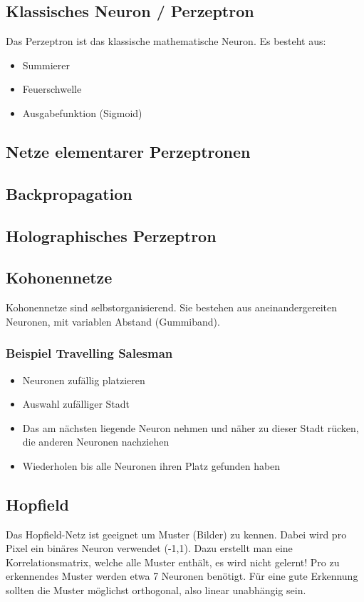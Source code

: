 \subsection{Klassisches Neuron / Perzeptron}
Das Perzeptron ist das klassische mathematische Neuron. Es besteht aus:
\begin{itemize}
	\item Summierer
	\item Feuerschwelle
	\item Ausgabefunktion (Sigmoid)
\end{itemize}
\subsection{Netze elementarer Perzeptronen}
\subsection{Backpropagation}
\subsection{Holographisches Perzeptron}
\subsection{Kohonennetze}
Kohonennetze sind selbstorganisierend. Sie bestehen aus aneinandergereiten Neuronen, mit variablen Abstand (Gummiband).
\subsubsection{Beispiel Travelling Salesman}
\begin{itemize}
	\item Neuronen zufällig platzieren
	\item Auswahl zufälliger Stadt
	\item Das am nächsten liegende Neuron nehmen und näher zu dieser Stadt rücken, die anderen Neuronen nachziehen
	\item Wiederholen bis alle Neuronen ihren Platz gefunden haben
\end{itemize}
\subsection{Hopfield}
Das Hopfield-Netz ist geeignet um Muster (Bilder) zu kennen. Dabei wird pro Pixel ein binäres Neuron verwendet (-1,1).
Dazu erstellt man eine Korrelationsmatrix, welche alle Muster enthält, es wird nicht gelernt!
Pro zu erkennendes Muster werden etwa 7 Neuronen benötigt.
Für eine gute Erkennung sollten die Muster möglichst orthogonal, also linear unabhängig sein.

